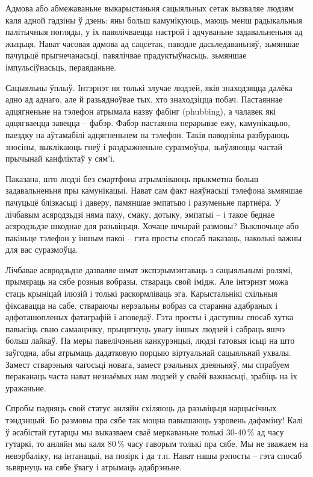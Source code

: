 Адмова або абмежаваньне выкарыстаньня сацыяльных сетак вызваляе людзям каля адной гадзіны ў дзень: яны больш камунікуюць, маюць менш радыкальныя палітычныя погляды, у іх павялічваецца настрой і адчуваньне задавальненьня ад жыцьця. Нават часовая адмова ад сацсетак, паводле дасьледаваньняў, зьмяншае пачуцьцё прыгнечанасьці, павялічвае прадуктыўнасьць, зьмяншае імпульсіўнасьць, пераяданьне.

Сацыяльны ўплыў. Інтэрнэт ня толькі злучае людзей, якія знаходзяцца далёка адно ад аднаго, але й разьядноўвае тых, хто знаходзіцца побач. Пастаяннае адцягненьне на тэлефон атрымала назву фабінг (phubbing), а чалавек які адцягваецца завецца – фабэр. Фабэр пастаянна перарывае ежу, камунікацыю, паездку на аўтамабілі адцягненьнем на тэлефон. Такія паводзіны разбураюць зносіны, выклікаюць гнеў і раздражненьне суразмоўцы, зьяўляюцца частай прычынай канфліктаў у сям'і.

Паказана, што людзі без смартфона атрымліваюць прыкметна больш задавальненьня пры камунікацыі. Нават сам факт наяўнасьці тэлефона зьмяншае пачуцьцё блізкасьці і даверу, памяншае эмпатыю і разуменьне партнёра. У лічбавым асяродзьдзі няма паху, смаку, дотыку, эмпатыі – і такое беднае асяродзьдзе шкоднае для разьвіцьця. Хочаце шчырай размовы? Выключыце або пакіньце тэлефон у іншым пакоі – гэта просты спосаб паказаць, наколькі важны для вас суразмоўца.

Лічбавае асяродзьдзе дазваляе шмат экспэрымэнтаваць з сацыяльнымі ролямі, прымяраць на сябе розныя вобразы, ствараць свой імідж. Але інтэрнэт можа стаць крыніцай ілюзій і толькі раскормліваць эга. Карыстальнікі схільныя фіксавацца на сабе, ствараючы нерэальны вобраз са старанна адабраных і адфоташопленых фатаграфій і аповедаў. Гэта просты і даступны спосаб хутка павысіць сваю самаацэнку, прыцягнуць увагу іншых людзей і сабраць яшчэ больш лайкаў. Па меры павелічэньня канкурэнцыі, людзі гатовыя ісьці на што заўгодна, абы атрымаць дадатковую порцыю віртуальнай сацыяльнай ухвалы. Замест стварэньня чагосьці новага, замест рэальных дзеяньняў, мы спрабуем пераканаць часта нават незнаёмых нам людзей у сваёй важнасьці, зрабіць на іх уражаньне.

Спробы падняць свой статус анляйн схіляюць да разьвіцьця нарцысічных тэндэнцый. Бо размовы пра сябе так моцна павышаюць узровень дафаміну! Калі ў асабістай гутарцы мы выказваем сваё меркаваньне толькі 30-40\,\% ад часу гутаркі, то анляйн мы каля 80\,\% часу гаворым толькі пра сябе. Мы не зважаем на невэрбаліку, на інтанацыі, на позірк і да т.п. Нават нашы рэпосты – гэта спосаб зьвярнуць на сябе ўвагу і атрымаць адабрэньне.

